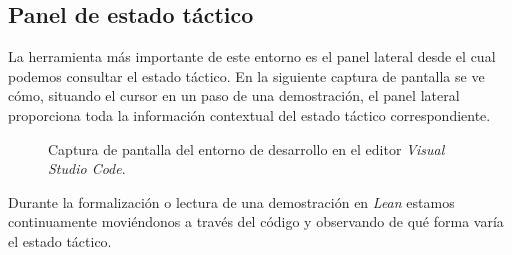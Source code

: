 \subsection*{Panel de estado táctico}

La herramienta más importante de este entorno es el panel lateral desde el cual
podemos consultar el estado táctico. En la siguiente captura de pantalla se ve
cómo, situando el cursor en un paso de una demostración, el panel lateral
proporciona toda la información contextual del estado táctico correspondiente.

\begin{figure}[htbp]
	\centerline{}
	\caption*{Captura de pantalla del entorno de desarrollo en el editor \textit{Visual Studio Code}.}
	\label{figure:entorno}
\end{figure}

Durante la formalización o lectura de una demostración en \textit{Lean} estamos
continuamente moviéndonos a través del código y observando de qué forma varía el
estado táctico.



